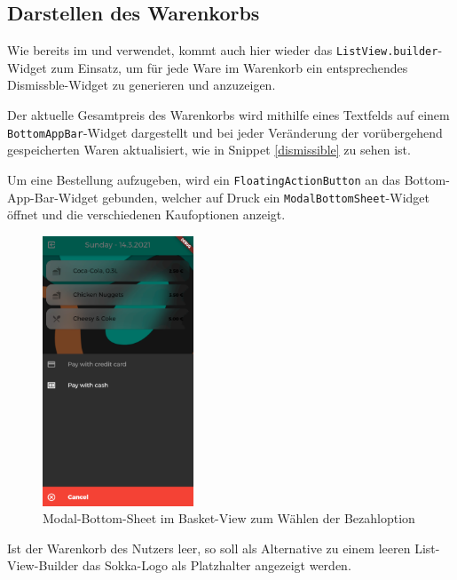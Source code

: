 \subsection{Darstellen des Warenkorbs}

Wie bereits im  und  verwendet, kommt auch hier wieder
das \lstinline{ListView.builder}-Widget zum Einsatz, um für jede Ware im Warenkorb ein 
entsprechendes Dismissble-Widget zu generieren und anzuzeigen.

Der aktuelle Gesamtpreis des Warenkorbs wird mithilfe eines Textfelds auf einem
\lstinline{BottomAppBar}-Widget dargestellt und bei jeder Veränderung der vorübergehend 
gespeicherten Waren aktualisiert, wie in Snippet \ref{dismissible} zu sehen ist.

Um eine Bestellung aufzugeben, wird ein \lstinline{FloatingActionButton} an das Bottom-App-Bar-Widget gebunden, welcher auf Druck ein \lstinline{ModalBottomSheet}-Widget öffnet und die verschiedenen
Kaufoptionen anzeigt.

\begin{figure}[H]
    \centering
    \includegraphics[width=0.40\textwidth]{images/Client/views/basketview/modalSheet.png}
    \caption{Modal-Bottom-Sheet im Basket-View zum Wählen der Bezahloption}
\end{figure}

Ist der Warenkorb des Nutzers leer, so soll als Alternative zu einem leeren List-View-Builder
das Sokka-Logo als Platzhalter angezeigt werden.

